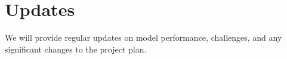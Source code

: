 \documentclass[10pt]{article}
\begin{document}
\section{Updates}


We will provide regular updates on model performance, challenges,
and any significant changes to the project plan.


\footnotesize


\end{document}
